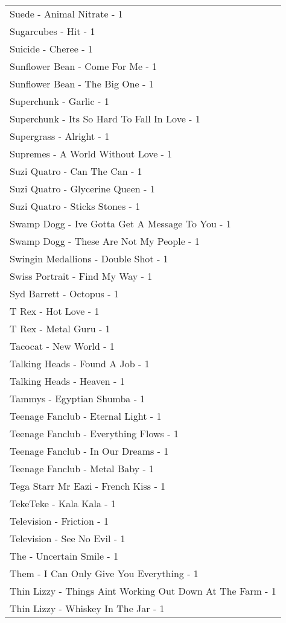 \documentclass[
]{article}
\begin{document}
\begin{longtable}{l}
Suede - Animal Nitrate - 1 \\ 
Sugarcubes - Hit - 1 \\ 
Suicide - Cheree - 1 \\ 
Sunflower Bean - Come For Me - 1 \\ 
Sunflower Bean - The Big One - 1 \\ 
Superchunk - Garlic - 1 \\ 
Superchunk - Its So Hard To Fall In Love - 1 \\ 
Supergrass - Alright - 1 \\ 
Supremes - A World Without Love - 1 \\ 
Suzi Quatro - Can The Can - 1 \\ 
Suzi Quatro - Glycerine Queen - 1 \\ 
Suzi Quatro - Sticks Stones - 1 \\ 
Swamp Dogg - Ive Gotta Get A Message To You - 1 \\ 
Swamp Dogg - These Are Not My People - 1 \\ 
Swingin Medallions - Double Shot - 1 \\ 
Swiss Portrait - Find My Way - 1 \\ 
Syd Barrett - Octopus - 1 \\ 
T Rex - Hot Love - 1 \\ 
T Rex - Metal Guru - 1 \\ 
Tacocat - New World - 1 \\ 
Talking Heads - Found A Job - 1 \\ 
Talking Heads - Heaven - 1 \\ 
Tammys - Egyptian Shumba - 1 \\ 
Teenage Fanclub - Eternal Light - 1 \\ 
Teenage Fanclub - Everything Flows - 1 \\ 
Teenage Fanclub - In Our Dreams - 1 \\ 
Teenage Fanclub - Metal Baby - 1 \\ 
Tega Starr Mr Eazi - French Kiss - 1 \\ 
TekeTeke - Kala Kala - 1 \\ 
Television - Friction - 1 \\ 
Television - See No Evil - 1 \\ 
The - Uncertain Smile - 1 \\ 
Them - I Can Only Give You Everything - 1 \\ 
Thin Lizzy - Things Aint Working Out Down At The Farm - 1 \\ 
Thin Lizzy - Whiskey In The Jar - 1 \\ 

\end{longtable}
\end{document}

